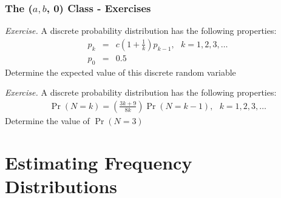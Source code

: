 \documentclass{beamer}
\begin{document}
\begin{frame}[shrink=2]%
 \frametitle{The ($a, b$, 0) Class - Exercises}
\textit{Exercise.}  A discrete probability distribution has the
following properties:
\begin{eqnarray*}
p_k&=&c\left( 1+\frac{1}{k}\right) p_{k-1}, \:\:\: k=1,2,3, \dots \\
p_0&=& 0.5
\end{eqnarray*} \vspace{2mm}
Determine the expected value of this discrete random variable
\vspace{4mm}

\textit{Exercise.} A discrete probability distribution has the
following properties:
\begin{eqnarray*}
\Pr(N=k) = \left( \frac{3k+9}{8k}\right) \Pr(N=k-1), ~~~k=1,2,3,\ldots
\end{eqnarray*} \vspace{2mm}
Determine the value of $\Pr(N=3)$

\end{frame}

\section{Estimating Frequency Distributions}
\end{document}
